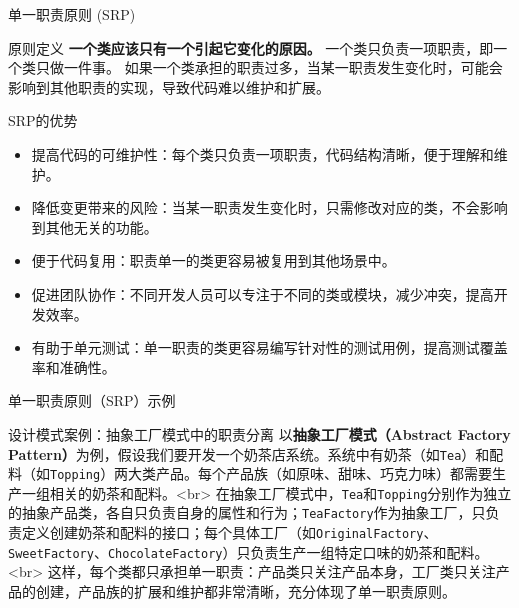 \documentclass[UTF8,aspectratio=169]{beamer}
\begin{document}
\begin{frame}{单一职责原则 (SRP)}
    \begin{ytublock}{原则定义}
        \textbf{一个类应该只有一个引起它变化的原因。}
        一个类只负责一项职责，即一个类只做一件事。
        如果一个类承担的职责过多，当某一职责发生变化时，可能会影响到其他职责的实现，导致代码难以维护和扩展。
    \end{ytublock}
    \begin{ytublock}{SRP的优势}
        \begin{itemize}
            \item 提高代码的可维护性：每个类只负责一项职责，代码结构清晰，便于理解和维护。
            \item 降低变更带来的风险：当某一职责发生变化时，只需修改对应的类，不会影响到其他无关的功能。
            \item 便于代码复用：职责单一的类更容易被复用到其他场景中。
            \item 促进团队协作：不同开发人员可以专注于不同的类或模块，减少冲突，提高开发效率。
            \item 有助于单元测试：单一职责的类更容易编写针对性的测试用例，提高测试覆盖率和准确性。
        \end{itemize}

    \end{ytublock}
\end{frame}

\begin{frame}{单一职责原则（SRP）示例}
    \begin{exampleytublock}{设计模式案例：抽象工厂模式中的职责分离}
        以\textbf{抽象工厂模式（Abstract Factory Pattern）}为例，假设我们要开发一个奶茶店系统。系统中有奶茶（如\texttt{Tea}）和配料（如\texttt{Topping}）两大类产品。每个产品族（如原味、甜味、巧克力味）都需要生产一组相关的奶茶和配料。<br>
        在抽象工厂模式中，\texttt{Tea}和\texttt{Topping}分别作为独立的抽象产品类，各自只负责自身的属性和行为；\texttt{TeaFactory}作为抽象工厂，只负责定义创建奶茶和配料的接口；每个具体工厂（如\texttt{OriginalFactory}、\texttt{SweetFactory}、\texttt{ChocolateFactory}）只负责生产一组特定口味的奶茶和配料。<br>
        这样，每个类都只承担单一职责：产品类只关注产品本身，工厂类只关注产品的创建，产品族的扩展和维护都非常清晰，充分体现了单一职责原则。
    \end{exampleytublock}
\end{frame}
\end{document}
